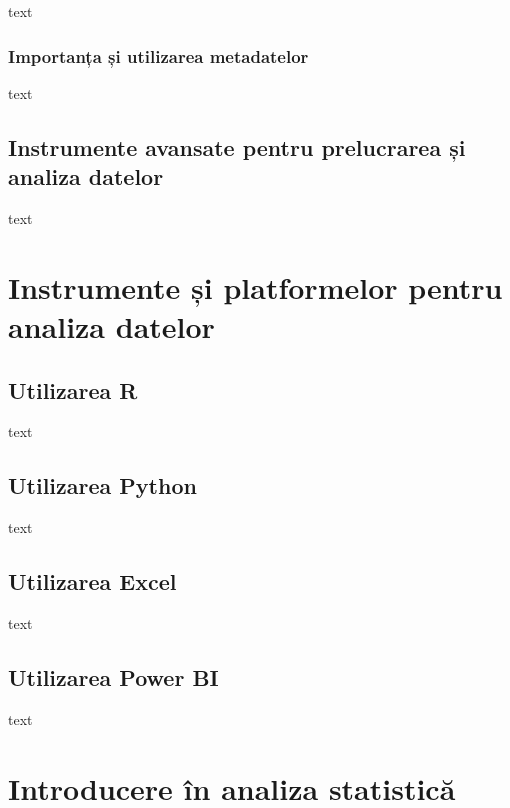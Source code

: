 \documentclass[
  11pt,
  b5paper,
  nottoc]{book}
\begin{document}
text

\subsection{Importanța și utilizarea
metadatelor}\label{importanux21ba-ux219i-utilizarea-metadatelor}

text

\section{Instrumente avansate pentru prelucrarea și analiza
datelor}\label{instrumente-avansate-pentru-prelucrarea-ux219i-analiza-datelor}

text


\chapter{Instrumente și platformelor pentru analiza datelor}\label{cap2}

\section{Utilizarea R}\label{utilizarea-r}

text

\section{Utilizarea Python}\label{utilizarea-python}

text

\section{Utilizarea Excel}\label{utilizarea-excel}

text

\section{Utilizarea Power BI}\label{utilizarea-power-bi}

text


\chapter{Introducere în analiza statistică}\label{cap3}
\end{document}
